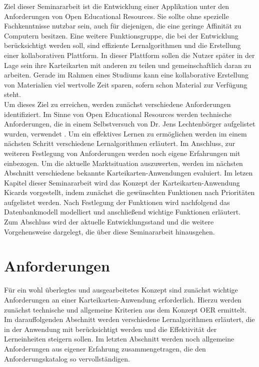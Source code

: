 \noindent Ziel dieser Seminararbeit ist die Entwicklung einer Applikation unter den Anforderungen von Open Educational Resources. Sie sollte ohne spezielle Fachkenntnisse nutzbar sein, auch für diejenigen, die eine geringe Affinität zu Computern besitzen. Eine weitere Funktionsgruppe, die bei der Entwicklung berücksichtigt werden soll, sind effiziente Lernalgorithmen und die Erstellung einer kollaborativen Plattform. In dieser Plattform sollen die Nutzer später in der Lage sein ihre Karteikarten mit anderen zu teilen und gemeinschaftlich daran zu arbeiten. Gerade im Rahmen eines Studiums kann eine kollaborative Erstellung von Materialien viel wertvolle Zeit sparen, sofern schon Material zur Verfügung steht. \\

\noindent Um dieses Ziel zu erreichen, werden zunächst verschiedene Anforderungen identifiziert. Im Sinne von Open Educational Resources werden technische Anforderungen, die in einem Selbstversuch von Dr. Jens Lechtenbörger aufgelistet wurden, verwendet \cite{Lechtenborger.2019}. Um ein effektives Lernen zu ermöglichen werden im einem nächsten Schritt verschiedene Lernalgorithmen erläutert. Im Anschluss, zur weiteren Festlegung von Anforderungen werden noch eigene Erfahrungen mit einbezogen. Um die aktuelle Marktsituation auszuwerten, werden im nächsten Abschnitt verschiedene bekannte Karteikarten-Anwendungen evaluiert. Im letzen Kapitel dieser Seminararbeit wird das Konzept der Karteikarten-Anwendung Kicards vorgestellt, indem zunächst die gewünschten Funktionen nach Prioritäten aufgelistet werden. Nach Festlegung der Funktionen wird nachfolgend das Datenbankmodell modelliert und anschließend wichtige Funktionen erläutert. Zum Abschluss wird der aktuelle Entwicklungsstand und die weitere Vorgehensweise dargelegt, die über diese Seminararbeit hinausgehen.

\section{Anforderungen}
Für ein wohl überlegtes und ausgearbeitetes Konzept sind zunächst wichtige Anforderungen an einer Karteikarten-Anwendung erforderlich. Hierzu werden zunächst technische und allgemeine Kriterien aus dem Konzept OER ermittelt. Im darauffolgenden Abschnitt werden verschiedene Lernalgorithmen erläutert, die in der Anwendung mit berücksichtigt werden und die Effektivität der Lerneinheiten steigern sollen. Im letzten Abschnitt werden noch allgemeine Anforderungen aus eigener Erfahrung zusammengetragen, die den Anforderungskatalog so vervollständigen.

